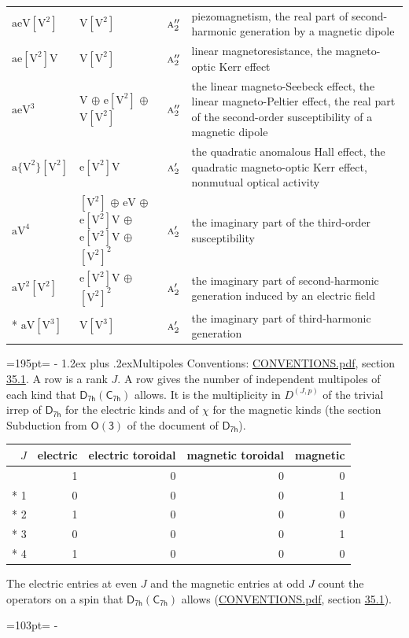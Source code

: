 \documentclass[10pt,a4paper]{article}
\makeatletter
\renewcommand\section{\@startsection{section}{1}{\z@}{-3ex plus -1ex minus -.2ex}%
  {1.2ex plus .2ex}{\normalfont\large\sffamily\bfseries\color{parttitle}}}
\newcommand{\needspace}[1]{\par\penalty-100\begingroup\dimen0=#1\relax\dimen2=\pagegoal
  \advance\dimen2-\pagetotal\ifdim\dimen0>\dimen2\relax\ifdim\dimen2>0pt\vfil\break\fi\fi
  \endgroup}
\numberwithin{equation}{section}
\newcommand{\grp}[1]{\mathsf{#1}}
\newcommand{\irr}[1]{\text{\normalfont\scshape #1}}
\newcommand{\irrJp}[2]{D^{(#1,#2)}}
\newcommand{\jahn}[1]{\mathrm{#1}}
\newlength{\fillwidth}\newlength{\cellwidth}\newlength{\colwidth}
\makeatother
\begin{document}
{\begin{longtable}{@{}lll>{\RaggedRight\arraybackslash}p{\fillwidth}@{}}
$\jahn{aeV[V^{2}]}$ & $\jahn{V[V^{2}]}$ & $\irr{a}_{2}''$ & piezomagnetism, the real part of second-harmonic generation by a magnetic dipole\\
$\jahn{ae[V^{2}]V}$ & $\jahn{V[V^{2}]}$ & $\irr{a}_{2}''$ & linear magnetoresistance, the magneto-optic Kerr effect\\
$\jahn{aeV^{3}}$ & $\jahn{V}$ $\oplus$ $\jahn{e[V^{2}]}$ $\oplus$ $\jahn{V[V^{2}]}$ & $\irr{a}_{2}''$ & the linear magneto-Seebeck effect, the linear magneto-Peltier effect, the real part of the second-order susceptibility of a magnetic dipole\\
$\jahn{a\{V^{2}\}[V^{2}]}$ & $\jahn{e[V^{2}]V}$ & $\irr{a}_{2}'$ & the quadratic anomalous Hall effect, the quadratic magneto-optic Kerr effect, nonmutual optical activity\\
$\jahn{aV^{4}}$ & $\jahn{[V^{2}]}$ $\oplus$ $\jahn{eV}$ $\oplus$ $\jahn{e[V^{2}]V}$ $\oplus$ $\jahn{e[V^{2}]V}$ $\oplus$ $\jahn{[V^{2}]^{2}}$ & $\irr{a}_{2}'$ & the imaginary part of the third-order susceptibility\\
$\jahn{aV^{2}[V^{2}]}$ & $\jahn{e[V^{2}]V}$ $\oplus$ $\jahn{[V^{2}]^{2}}$ & $\irr{a}_{2}'$ & the imaginary part of second-harmonic generation induced by an electric field\\*
$\jahn{aV[V^{3}]}$ & $\jahn{V[V^{3}]}$ & $\irr{a}_{2}'$ & the imaginary part of third-harmonic generation\\
\bottomrule\end{longtable}}
\needspace{195pt}
\section{Multipoles}\label{s:multipoles}
Conventions: \href{../../CONVENTIONS.pdf}{CONVENTIONS.pdf}, section \href{../../CONVENTIONS.pdf\#conv.35.1}{35.1}.
A row is a rank $J$. \label{n:head.multipole.electric}\label{n:head.multipole.electric.toroidal}\label{n:head.multipole.magnetic.toroidal}\label{n:head.multipole.magnetic}A row gives the number of independent multipoles of each kind that $\grp{D_{7h}}(\grp{C_{7h}})$ allows. It is the multiplicity in $\irrJp{J}{p}$ of the trivial irrep of $\grp{D_{7h}}$ for the electric kinds and of $\chi$ for the magnetic kinds (the section Subduction from $\grp{O(3)}$ of the document of \href{../../../rotation/data/pdf/D7h.pdf}{$\grp{D_{7h}}$}).
{\small\begin{longtable}{@{}rrrrr@{}}\toprule
$J$ & electric & electric toroidal & magnetic toroidal & magnetic\\\midrule\endhead
\bottomrule\endfoot\endlastfoot
0 & 1 & 0 & 0 & 0\\*
1 & 0 & 0 & 0 & 1\\*
2 & 1 & 0 & 0 & 0\\*
3 & 0 & 0 & 0 & 1\\*
4 & 1 & 0 & 0 & 0\\
\bottomrule\end{longtable}}
The electric entries at even $J$ and the magnetic entries at odd $J$ count the operators on a spin that $\grp{D_{7h}}(\grp{C_{7h}})$ allows (\href{../../CONVENTIONS.pdf}{CONVENTIONS.pdf}, section \href{../../CONVENTIONS.pdf\#conv.35.1}{35.1}).
\needspace{103pt}
\end{document}

